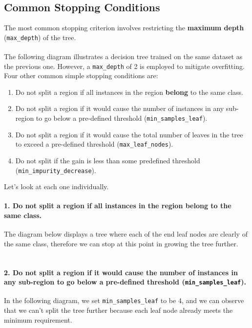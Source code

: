 \documentclass[10pt,a4paper]{report}
\begin{document}
\subsection{Common Stopping Conditions}
The most common stopping criterion involves restricting the \textbf{maximum depth} (\texttt{max\_depth}) of the tree.\\\\
The following diagram illustrates a decision tree trained on the same dataset as the previous one. However, a \texttt{max\_depth} of 2 is employed to mitigate overfitting.\\
Four other common simple stopping conditions are:
\begin{enumerate}
\item Do not split a region if all instances in the region \textbf{belong} to the same class.
\item Do not split a region if it would cause the number of instances in any sub-region to go below a pre-defined threshold (\texttt{min\_samples\_leaf}).
\item Do not split a region if it would cause the total number of leaves in the tree to exceed a pre-defined threshold (\texttt{max\_leaf\_nodes}).
\item Do not split if the gain is less than some pre\-defined threshold (\texttt{min\_impurity\_decrease}).
\end{enumerate}
Let's look at each one individually.
\paragraph{1. Do not split a region if all instances in the region belong to the same class.} The diagram below displays a tree where each of the end leaf nodes are clearly of the same class, therefore we can stop at this point in growing the tree further.\\
\\
\paragraph{2. Do not split a region if it would cause the number of instances in any sub-region to go below a pre-defined threshold (\texttt{min\_samples\_leaf}).}In the following diagram, we set \texttt{min\_samples\_leaf} to be 4, and we can observe that we can't split the tree further because each leaf node already meets the minimum requirement.\\
\end{document}
